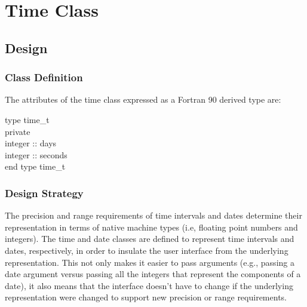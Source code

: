 \documentclass[]{article}
\begin{document}
%



%

\section{Time Class}



\subsection{Design}

\subsubsection{Class Definition}

The attributes of the time class expressed as a Fortran 90 derived type are:

\noindent type time\_t \\
\indent private \\
\indent integer :: days \\
\indent integer :: seconds \\
\noindent end type time\_t

\subsubsection{Design Strategy}

The precision and range requirements of time intervals and dates determine their representation in 
terms of native machine types (i.e, floating point numbers and integers). The time and date classes
are defined to represent time intervals and dates, respectively, in order to insulate the user interface 
from the underlying representation.  This not only makes it easier to pass arguments (e.g., passing a
date argument versus passing all the integers that represent the components of a date), it also means 
that the interface doesn't have to change if the underlying representation were changed to support 
new precision or range requirements.
\end{document}
